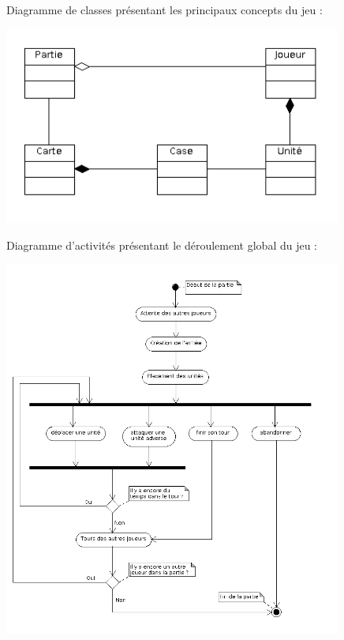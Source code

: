 \documentclass[a4paper,10pt]{report}
\begin{document}
    Diagramme de classes présentant les principaux concepts du jeu : 
    
		\includegraphics[width=420px]{diagrammes/concept-fightly.png}

    Diagramme d'activités présentant le déroulement global du jeu : 
    
    \includegraphics[width=420px]{diagrammes/fightlyactivites.png}
    
\end{document}
